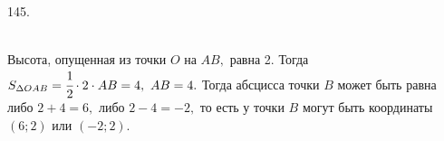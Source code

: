 145. \begin{figure}[ht!]
\end{figure}\\
Высота, опущенная из точки $O$ на $AB,$ равна 2. Тогда $S_{\Delta OAB}=\cfrac{1}{2}\cdot 2 \cdot AB=4,\ AB=4.$ Тогда абсцисса точки $B$ может быть равна либо $2+4=6,$ либо $2-4=-2,$ то есть у точки $B$ могут быть координаты $(6;2)$ или $(-2;2).$\\
